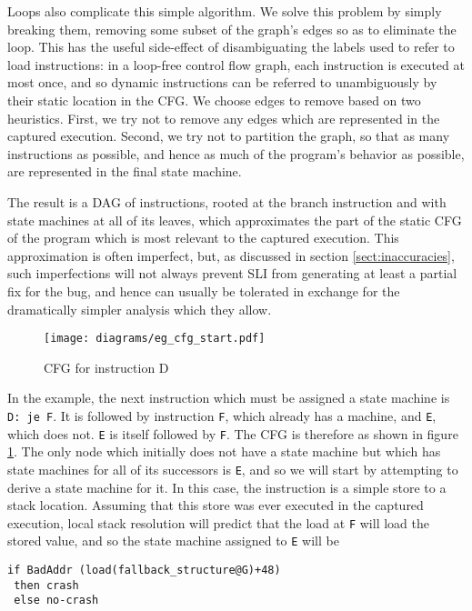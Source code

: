 \documentclass[10pt,twocolumn,preprint,natbib,authoryear]{sigplanconf}
\begin{document}
Loops also complicate this simple algorithm.  We solve this problem by
simply breaking them, removing some subset of the graph's edges so as
to eliminate the loop.  This has the useful side-effect of
disambiguating the labels used to refer to load instructions: in a
loop-free control flow graph, each instruction is executed at most
once, and so dynamic instructions can be referred to unambiguously by
their static location in the CFG.  We choose edges to remove based on
two heuristics.  First, we try not to remove any edges which are
represented in the captured execution.  Second, we try not to
partition the graph, so that as many instructions as possible, and
hence as much of the program's behavior as possible, are represented
in the final state machine.

The result is a DAG of instructions, rooted at the branch instruction
and with state machines at all of its leaves, which approximates the
part of the static CFG of the program which is most relevant to the
captured execution.  This approximation is often imperfect, but, as
discussed in section \ref{sect:inaccuracies}, such imperfections will
not always prevent SLI from generating at least a partial fix for the
bug, and hence can usually be tolerated in exchange for the
dramatically simpler analysis which they allow.

\begin{figure}
\texttt{[image: diagrams/eg\_cfg\_start.pdf]}
\caption{CFG for instruction D}
\label{fig:eg_cfg}
\end{figure}

In the example, the next instruction which must be assigned a state
machine is \verb|D: je F|.  It is followed by instruction \verb|F|,
which already has a machine, and \verb|E|, which does not.  \verb|E|
is itself followed by \verb|F|.  The CFG is therefore as shown in
figure \ref{fig:eg_cfg}.  The only node which initially does not have
a state machine but which has state machines for all of its successors
is \verb|E|, and so we will start by attempting to derive a state
machine for it.  In this case, the instruction is a simple store to a
stack location.  Assuming that this store was ever executed in the
captured execution, local stack resolution will predict that the load
at \verb|F| will load the stored value, and so the state machine
assigned to \verb|E| will be

\begin{verbatim}
if BadAddr (load(fallback_structure@G)+48)
 then crash
 else no-crash
\end{verbatim}
\end{document}
